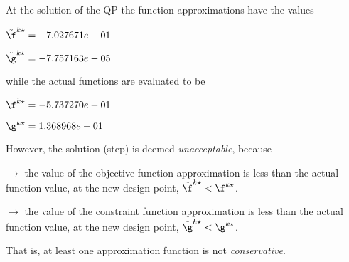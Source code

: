 At the solution of the QP the function approximations have the values

$\tilde \f^{k\star} = -7.027671e-01$

$\tilde \g^{k\star} = -7.757163e-05$

\bigskip
while the actual functions are evaluated to be

$\f^{k\star} = -5.737270e-01$

$\g^{k\star} =  1.368968e-01$

\bigskip
 However, the solution (step)                     is deemed \emph{unacceptable}, because 
 
$\to$ the value of the objective                         function approximation is less than the actual function                         value, at the new design point,                         $\tilde {\f}^{k\star} < {\f}^{k\star}$.

 $\to$ the value of the constraint function                         approximation is less than the actual function value, at                         the new design point, $\tilde {\g}^{k\star} < {\g}^{k\star}$.

 \bigskip 

 That is, at least one approximation                     function is not \emph{conservative}.
